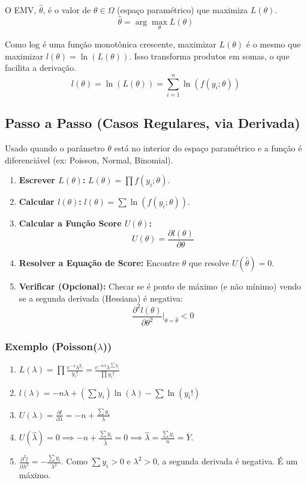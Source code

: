 \begin{definicao}
O EMV, $\hat{\theta}$, é o valor de $\theta \in \Omega$ (espaço paramétrico) que maximiza $L(\theta)$.
$$ \hat{\theta} = \arg \max_{\theta} L(\theta) $$
\end{definicao}

\begin{definicao}
Como log é uma função monotônica crescente, maximizar $L(\theta)$ é o mesmo que maximizar $l(\theta) = \ln(L(\theta))$. Isso transforma produtos em somas, o que facilita a derivação.
$$ l(\theta) = \ln(L(\theta)) = \sum_{i=1}^n \ln(f(y_i; \theta)) $$
\end{definicao}

\subsection{Passo a Passo (Casos Regulares, via Derivada)}
Usado quando o parâmetro $\theta$ está no interior do espaço paramétrico e a função é diferenciável (ex: Poisson, Normal, Binomial).

\begin{enumerate}
    \item \textbf{Escrever $L(\theta)$:} $L(\theta) = \prod f(y_i; \theta)$.
    \item \textbf{Calcular $l(\theta)$:} $l(\theta) = \sum \ln(f(y_i; \theta))$.
    \item \textbf{Calcular a Função Score $U(\theta)$:}
    $$ U(\theta) = \frac{\partial l(\theta)}{\partial \theta} $$
    \item \textbf{Resolver a Equação de Score:}
    Encontre $\hat{\theta}$ que resolve $U(\hat{\theta}) = 0$.
    \item \textbf{Verificar (Opcional):} Checar se é ponto de máximo (e não mínimo) vendo se a segunda derivada (Hessiana) é negativa:
    $$ \frac{\partial^2 l(\theta)}{\partial \theta^2} \bigg|_{\theta=\hat{\theta}} < 0 $$
\end{enumerate}

\subsubsection{Exemplo (Poisson($\lambda$))}
\begin{enumerate}
    \item $L(\lambda) = \prod \frac{e^{-\lambda} \lambda^{y_i}}{y_i!} = \frac{e^{-n\lambda} \lambda^{\sum y_i}}{\prod y_i!}$
    \item $l(\lambda) = -n\lambda + (\sum y_i) \ln(\lambda) - \sum \ln(y_i!)$
    \item $U(\lambda) = \frac{\partial l}{\partial \lambda} = -n + \frac{\sum y_i}{\lambda}$
    \item $U(\hat{\lambda}) = 0 \implies -n + \frac{\sum y_i}{\hat{\lambda}} = 0 \implies \hat{\lambda} = \frac{\sum y_i}{n} = \overline{Y}$.
    \item $\frac{\partial^2 l}{\partial \lambda^2} = -\frac{\sum y_i}{\lambda^2}$. Como $\sum y_i > 0$ e $\lambda^2 > 0$, a segunda derivada é negativa. É um máximo.
\end{enumerate}

